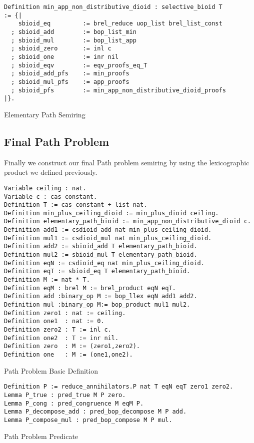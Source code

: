 \begin{listing}[H]
\begin{verbatim}
Definition min_app_non_distributive_dioid : selective_bioid T
:= {|
    sbioid_eq         := brel_reduce uop_list brel_list_const
  ; sbioid_add        := bop_list_min
  ; sbioid_mul        := bop_list_app                                 
  ; sbioid_zero       := inl c
  ; sbioid_one        := inr nil
  ; sbioid_eqv        := eqv_proofs_eq_T
  ; sbioid_add_pfs    := min_proofs
  ; sbioid_mul_pfs    := app_proofs
  ; sbioid_pfs        := min_app_non_distributive_dioid_proofs
|}.
\end{verbatim}
\caption{Elementary Path Semiring} 
\label{coq:def:min_app_non_distributive_dioid}
\end{listing}
\subsection{Final Path Problem}
Finally we construct our final Path problem semiring by using the lexicographic product we defined previously.
\begin{listing}[H]
\begin{verbatim}
Variable ceiling : nat.
Variable c : cas_constant.
Definition T := cas_constant + list nat.
Definition min_plus_ceiling_dioid := min_plus_dioid ceiling.
Definition elementary_path_bioid := min_app_non_distributive_dioid c.
Definition add1 := csdioid_add nat min_plus_ceiling_dioid.
Definition mul1 := csdioid_mul nat min_plus_ceiling_dioid.
Definition add2 := sbioid_add T elementary_path_bioid.
Definition mul2 := sbioid_mul T elementary_path_bioid.
Definition eqN := csdioid_eq nat min_plus_ceiling_dioid.
Definition eqT := sbioid_eq T elementary_path_bioid.
Definition M := nat * T.
Definition eqM : brel M := brel_product eqN eqT.
Definition add :binary_op M := bop_llex eqN add1 add2.
Definition mul :binary_op M:= bop_product mul1 mul2.
Definition zero1 : nat := ceiling.
Definition one1  : nat := 0.
Definition zero2 : T := inl c.
Definition one2  : T := inr nil.
Definition zero  : M := (zero1,zero2).
Definition one   : M := (one1,one2).
\end{verbatim}
\caption{Path Problem Basic Definition} 
\label{coq:def:path_problem_basic}
\end{listing}

\begin{listing}[H]
\begin{verbatim}
Definition P := reduce_annihilators.P nat T eqN eqT zero1 zero2.
Lemma P_true : pred_true M P zero.
Lemma P_cong : pred_congruence M eqM P.
Lemma P_decompose_add : pred_bop_decompose M P add.
Lemma P_compose_mul : pred_bop_compose M P mul.
\end{verbatim}
\caption{Path Problem Predicate} 
\label{coq:def:path_problem_predicate}
\end{listing}


